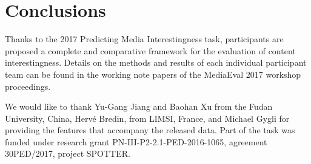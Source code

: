 \documentclass[sigconf]{acmart-me}
\begin{document}
\vspace{-0.2cm}
\section{Conclusions}
Thanks to the 2017 Predicting Media Interestingness task, participants are proposed a complete and comparative framework for the evaluation of content interestingness. 
Details on the methods and results of each individual
participant team can be found in the working note papers of the
MediaEval 2017 workshop proceedings.

\vspace{-0.2cm}
\begin{acks}
{\small
We would like to thank Yu-Gang Jiang and Baohan Xu
from the Fudan University, China, Herv\'{e} Bredin, from LIMSI,
France, and Michael Gygli for providing the features that accompany the
released data. Part of the task was funded under research grant PN-III-P2-2.1-PED-2016-1065, agreement 30PED/2017, project SPOTTER.}
\end{acks}



\def\bibfont{\small} %

\end{document}
